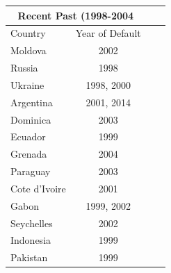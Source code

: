 \documentclass[a4paper]{article}
\begin{document}
\begin{table}
\centering
\begin{tabular}{lccc}
\hline
\multicolumn{2}{c}{Recent Past (1998-2004}\\
\hline\hline
Country & Year of Default \\
\hline
Moldova & 2002\\
Russia & 1998\\
Ukraine & 1998, 2000\\
Argentina & 2001, 2014\\
Dominica & 2003\\
Ecuador & 1999\\
Grenada & 2004\\
Paraguay & 2003\\
Cote d'Ivoire & 2001\\
Gabon & 1999, 2002\\
Seychelles & 2002\\
Indonesia & 1999\\
Pakistan & 1999\\
\hline\hline
\end{tabular}
\end{table}
\end{document}
